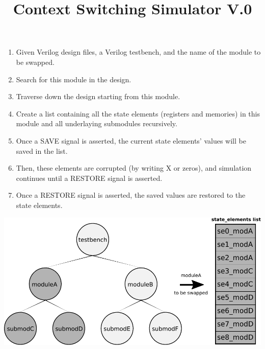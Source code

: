 \documentclass{article}
\begin{document}
\title{Context Switching Simulator V.0}
\date{\vspace{-5ex}}
\maketitle

\begin{enumerate}

\item Given Verilog design files, a Verilog testbench, and the name of the module to be swapped. 

\item Search for this module in the design. 

\item Traverse down the design starting from this module. 

\item Create a list containing all the state elements (registers and memories) in this module and all underlaying submodules recursively. 

\item Once a SAVE signal is asserted, the current state elements' values
will be saved in the list. 

\item Then, these elements are corrupted (by writing X or zeros), and simulation continues until a RESTORE signal is asserted. 

\item Once a RESTORE signal is asserted, the saved values are restored to
the state elements.

\end{enumerate}


\begin{center}
\includegraphics[width=14cm]{cssim_graph}
\end{center}
\end{document}

